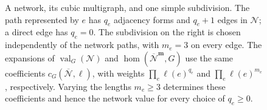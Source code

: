 \documentclass[11pt,a4paper]{article}
\theoremstyle{plain}
\theoremstyle{definition}
\DeclareMathOperator{\val}{val}
\begin{document}
\begin{figure}[tb]
\caption{A network, its cubic multigraph, and one simple subdivision.
The path represented by $e$ has $q_e$ adjacency forms and $q_e+1$ edges in $\mathcal N$;
a direct edge has $q_e=0$.
The subdivision on the right is chosen independently of the network paths,
with $m_e=3$ on every edge.
The expansions of $\val_G(\mathcal N)$ and $\hom(\overline{\mathcal N}^{\mathbf m},G)$
use the same coefficients $c_G(\overline{\mathcal N},\ell)$, with weights
$\prod_e\ell(e)^{q_e}$ and $\prod_e\ell(e)^{m_e}$, respectively.
Varying the lengths $m_e\geq3$ determines these coefficients and hence
the network value for every choice of $q_e\geq0$.}
\label{fig:network-subdivision}
\end{figure}
\end{document}
